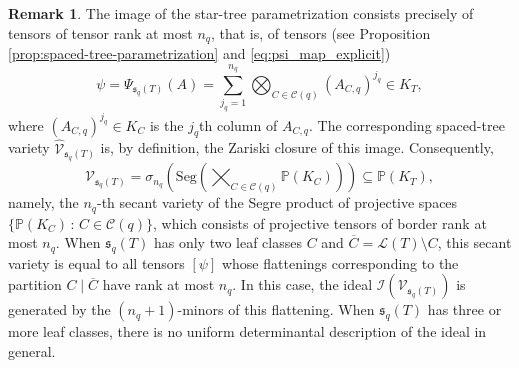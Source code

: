 \documentclass[12pt]{article}
\theoremstyle{definition}
\newtheorem{remark}[theorem]{Remark}
\numberwithin{theorem}{section}
\newcommand{\PP}{\mathbb{P}}
\newcommand{\V}{\mathcal{V}}
\begin{document}
\begin{remark}\label{rmk:s_q_variety}
The image of the star-tree parametrization consists precisely of tensors of tensor rank at most $n_q$, that is, of tensors (see Proposition \ref{prop:spaced-tree-parametrization} and \eqref{eq:psi_map_explicit})
\begin{equation*}
    \psi = \Psi_{\mathfrak{s}_q(T)}(A)  = \sum_{j_q=1}^{n_q} \bigotimes_{C \in \mathcal{C}(q)} (A_{C,q})^{j_q} \in K_T,
\end{equation*}
where $(A_{C,q})^{j_q} \in K_C$ is the $j_q$th column of $A_{C,q}$. 
The corresponding spaced-tree variety $\widehat{\V}_{\mathfrak{s}_q(T)}$ is, by definition, the Zariski closure of this image. Consequently,
\begin{equation*}
    \V_{\mathfrak{s}_q(T)} = \sigma_{n_q}\left(\mathrm{Seg}\left(\bigtimes_{C \in \mathcal{C}(q)} \PP\left(K_C\right)\right)\right) \subseteq \PP\left( K_T\right),
\end{equation*}
namely, the $n_q$-th secant variety
of the Segre product of  projective spaces $\{ \PP\left(K_C\right) \, : \, C \in \mathcal{C}(q)\}$, which consists of projective tensors of border rank at most $n_q$. When $\mathfrak{s}_q(T)$ has only two leaf classes $C$ and $\overline{C} = \mathcal{L}(T) \setminus C$,
this secant variety is equal to all tensors $[\psi]$ whose flattenings corresponding to the partition $C\mid\overline{C}$ have rank at most $n_q$. In this case, the ideal $\mathcal{I}(\V_{\mathfrak{s}_q(T)})$ is generated by the $(n_q+1)$-minors of this flattening. When $\mathfrak{s}_q(T)$ has three or more leaf classes, there is no uniform determinantal description of the ideal in general. 
\end{remark}
\end{document}
